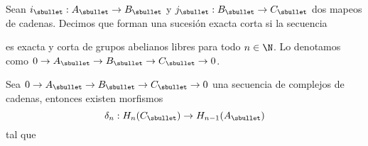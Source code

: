 \documentclass{article}
\begin{document}
\begin{dfn}
    Sean $i_{\sbullet}:A_{\sbullet}\to B_{\sbullet}$ y $j_{\sbullet}:B_{\sbullet}\to C_{\sbullet}$
    dos mapeos de cadenas. Decimos que forman una sucesión exacta corta si la secuencia

    \vspace{2mm}
    \centerline{
    }
    \vspace{2mm}
    \noindent es exacta y corta de grupos abelianos libres para todo $n\in\N$. Lo denotamos como
    $0\to A_{\sbullet}\to B_{\sbullet}\to C_{\sbullet}\to0$.
\end{dfn}

\begin{teo}
    Sea $0\to A_{\sbullet}\to B_{\sbullet}\to C_{\sbullet}\to0$ una secuencia de complejos de 
    cadenas, entonces existen morfismos
    \begin{equation*}
        \delta_{n}:H_{n}(C_{\sbullet})\to H_{n-1}(A_{\sbullet})
    \end{equation*}
    tal que
    
    \vspace{2mm}
    \centerline{
    }
\end{teo}
\end{document}
